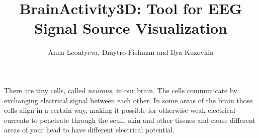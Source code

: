 \documentclass[twocolumn]{article}
\begin{document}
%
%
\title{BrainActivity3D: Tool for EEG Signal Source Visualization}
\author{Anna Leontyeva, Dmytro Fishman and Ilya Kuzovkin} 

%
%

%
%

There are tiny cells, called \emph{neurons}, in our brain. The cells communicate by exchanging electrical signal between each other. In some areas of the brain those cells align in a certain way, making it possible for otherwise weak electrical currents to penetrate through the scull, skin and other tissues and cause different areas of your head to have different electrical potential. 
\end{document}
